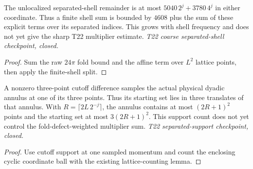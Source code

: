 \begin{lemma}
  \label{lem:normalized-cutoff-separated-shell-sum}
  \leanok
  The unlocalized separated-shell remainder is at most
  $5040\,2^j+3780\,4^j$ in either coordinate. Thus a finite shell sum
  is bounded by $4608$ plus the sum of these explicit terms over its
  separated indices. This grows with shell frequency and does not yet
  give the sharp T22 multiplier estimate.
  \emph{T22 coarse separated-shell checkpoint, closed.}
\end{lemma}
\begin{proof}\leanok
  Sum the raw $24\pi$ fold bound and the affine term over $L^2$
  lattice points, then apply the finite-shell split.
\end{proof}

\begin{lemma}
  \label{lem:normalized-cutoff-separated-support}
  \leanok
  A nonzero three-point cutoff difference samples the actual physical
  dyadic annulus at one of its three points. Thus its starting set lies
  in three translates of that annulus. With
  $R=\lceil2L\,2^{-j}\rceil$, the annulus contains at most $(2R+1)^2$
  points and the starting set at most $3(2R+1)^2$. This support count
  does not yet control the fold-defect-weighted multiplier sum.
  \emph{T22 separated-support checkpoint, closed.}
\end{lemma}
\begin{proof}\leanok
  Use cutoff support at one sampled momentum and count the enclosing
  cyclic coordinate ball with the existing lattice-counting lemma.
\end{proof}

